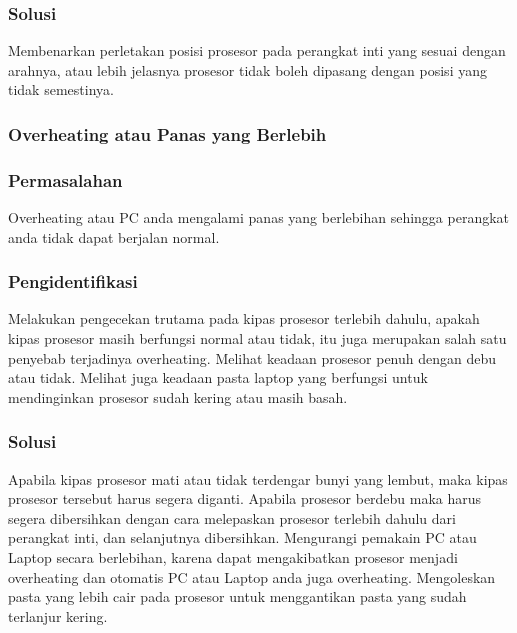 	\subsubsection{Solusi}
Membenarkan perletakan posisi prosesor pada perangkat inti yang sesuai dengan arahnya, atau lebih jelasnya prosesor tidak boleh
dipasang dengan posisi yang tidak semestinya.

\subsubsection{Overheating atau Panas yang Berlebih}
	\subsubsection{Permasalahan}
Overheating atau PC anda mengalami panas yang berlebihan sehingga perangkat anda tidak dapat berjalan normal.
	\subsubsection{Pengidentifikasi}
Melakukan pengecekan trutama pada kipas prosesor terlebih dahulu, apakah kipas prosesor masih berfungsi normal atau tidak, itu
juga merupakan salah satu penyebab terjadinya overheating. Melihat keadaan prosesor penuh dengan debu atau tidak. Melihat juga
keadaan pasta laptop yang berfungsi untuk mendinginkan prosesor sudah kering atau masih basah.
	\subsubsection{Solusi}
Apabila kipas prosesor mati atau tidak terdengar bunyi yang lembut, maka kipas prosesor tersebut harus segera diganti. Apabila
prosesor berdebu maka harus segera dibersihkan dengan cara melepaskan prosesor terlebih dahulu dari perangkat inti, dan
selanjutnya dibersihkan. Mengurangi pemakain PC atau Laptop secara berlebihan, karena dapat mengakibatkan prosesor menjadi
overheating dan otomatis PC atau Laptop anda juga overheating. Mengoleskan pasta yang lebih cair pada prosesor untuk 
menggantikan pasta yang sudah terlanjur kering.

